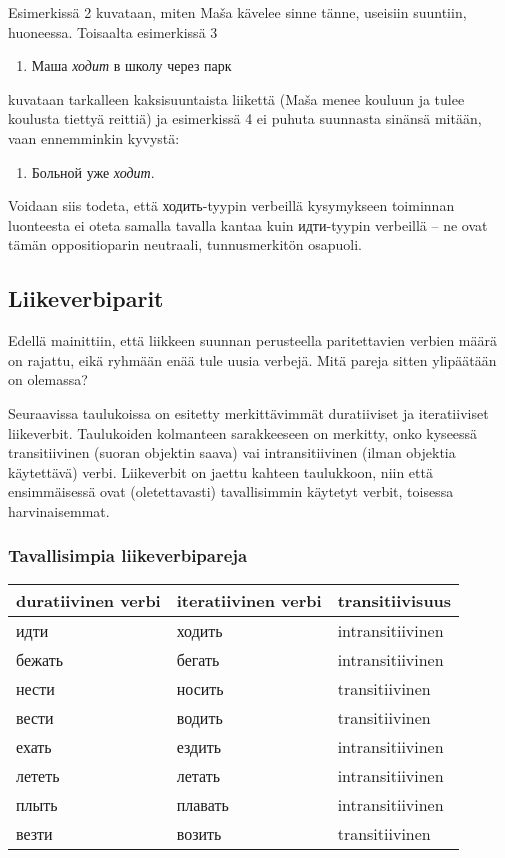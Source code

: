 \documentclass[]{scrartcl}
\providecommand{\tightlist}{%
  \setlength{\itemsep}{0pt}\setlength{\parskip}{0pt}}
\begin{document}
Esimerkissä 2 kuvataan, miten Maša kävelee sinne tänne, useisiin
suuntiin, huoneessa. Toisaalta esimerkissä 3

\begin{enumerate}
\def\labelenumi{(\arabic{enumi})}
\setcounter{enumi}{2}
\tightlist
\item
  Маша \emph{ходит} в школу через парк
\end{enumerate}

kuvataan tarkalleen kaksisuuntaista liikettä (Maša menee kouluun ja
tulee koulusta tiettyä reittiä) ja esimerkissä 4 ei puhuta suunnasta
sinänsä mitään, vaan ennemminkin kyvystä:

\begin{enumerate}
\def\labelenumi{(\arabic{enumi})}
\setcounter{enumi}{3}
\tightlist
\item
  Больной уже \emph{ходит}.
\end{enumerate}

Voidaan siis todeta, että ходить-tyypin verbeillä kysymykseen toiminnan
luonteesta ei oteta samalla tavalla kantaa kuin идти-tyypin verbeillä --
ne ovat tämän oppositioparin neutraali, tunnusmerkitön osapuoli.

\subsection{Liikeverbiparit}\label{liikeverbiparit}

Edellä mainittiin, että liikkeen suunnan perusteella paritettavien
verbien määrä on rajattu, eikä ryhmään enää tule uusia verbejä. Mitä
pareja sitten ylipäätään on olemassa?

Seuraavissa taulukoissa on esitetty merkittävimmät duratiiviset ja
iteratiiviset liikeverbit. Taulukoiden kolmanteen sarakkeeseen on
merkitty, onko kyseessä transitiivinen (suoran objektin saava) vai
intransitiivinen (ilman objektia käytettävä) verbi. Liikeverbit on
jaettu kahteen taulukkoon, niin että ensimmäisessä ovat (oletettavasti)
tavallisimmin käytetyt verbit, toisessa harvinaisemmat.

\subsubsection{Tavallisimpia
liikeverbipareja}\label{tavallisimpia-liikeverbipareja}

\begin{longtable}[c]{@{}lll@{}}
\toprule
duratiivinen verbi & iteratiivinen verbi &
transitiivisuus\tabularnewline
\midrule
\endhead
идти & ходить & intransitiivinen\tabularnewline
бежать & бегать & intransitiivinen\tabularnewline
нести & носить & transitiivinen\tabularnewline
вести & водить & transitiivinen\tabularnewline
ехать & ездить & intransitiivinen\tabularnewline
лететь & летать & intransitiivinen\tabularnewline
плыть & плавать & intransitiivinen\tabularnewline
везти & возить & transitiivinen\tabularnewline
\bottomrule
\end{longtable}
\end{document}
